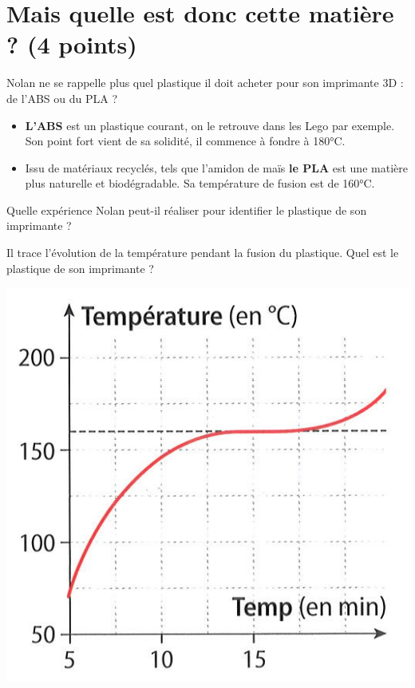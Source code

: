 \section{Mais quelle est donc cette matière ? (4 points)}

Nolan ne se rappelle plus quel plastique il doit acheter pour son imprimante 3D : de l'ABS ou du PLA ?

\begin{itemize}
	\item \textbf{L'ABS} est un plastique courant, on le retrouve dans les Lego par exemple. Son point fort vient de sa solidité, il commence à fondre à 180°C.
	
	\item Issu de matériaux recyclés, tels que l'amidon de maïs \textbf{le PLA} est une matière plus naturelle et biodégradable. Sa température de fusion est de 160°C.	
\end{itemize}

\begin{questions}
	\question[2] Quelle expérience Nolan peut-il réaliser pour identifier le plastique de son imprimante ?
	
	\question[2] Il trace l'évolution de la température pendant la fusion du plastique. Quel est le plastique de son imprimante ?
	
	\begin{center}
		\includegraphics[scale=0.45]{./img/courbe2}
	\end{center}
\end{questions}